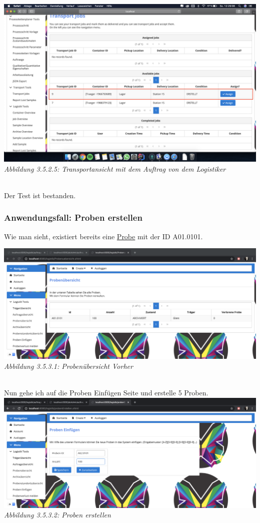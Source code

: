 \documentclass[enabledeprecatedfontcommands,fontsize=12pt,paper=a4,twoside]{scrartcl}
\begin{document}
 \hypertarget{sc3.5.2.5}{
\includegraphics[width=1\textwidth]{Screenshots/3525.png}
\textit{Abbildung 3.5.2.5: Transportansicht mit dem Auftrag von dem Logistiker}
} \\

Der Test ist bestanden.


\subsubsection{Anwendungsfall: Proben erstellen}

Wie man sieht, existiert bereits eine \hyperlink{sc3.5.3.1}{Probe} mit der ID A01.0101. 

 \hypertarget{sc3.5.3.1}{
\includegraphics[width=1\textwidth]{Screenshots/3531.png}
\textit{Abbildung 3.5.3.1: Probenübersicht Vorher}
} \\

Nun gehe ich auf die Proben Einfügen Seite und erstelle 5 Proben.   \\

 \hypertarget{sc3.5.3.2}{
\includegraphics[width=1\textwidth]{Screenshots/3532.png}
\textit{Abbildung 3.5.3.2: Proben erstellen}
} \\
\end{document}
